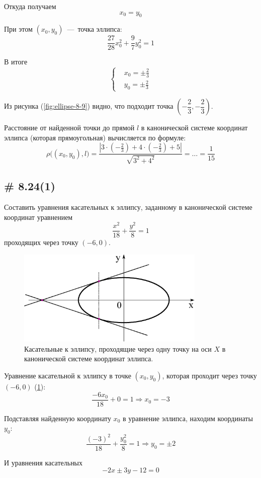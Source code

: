 \documentclass[a4paper,12pt]{article}
\begin{document}
\begin{solution}
    Откуда получаем
    \[
      x_0 = y_0
    \]
    
    При этом $(x_0, y_0)$~---~точка эллипса:
    \[
      \frac{27}{28} x_0^2 + \frac{9}{7} y_0^2 = 1
    \]
    
    В итоге
    \[
      \left\{
        \begin{aligned}
          &x_0 = \pm \frac{2}{3}\\
          &y_0 = \pm \frac{2}{3}
        \end{aligned}
      \right.
    \]
    
    Из рисунка (\ref{fig:ellipse-8-9}) видно, что подходит точка $\left(-\dfrac{2}{3}, -\dfrac{2}{3}\right)$.
    
    Расстояние от найденной точки до прямой $l$ в канонической системе координат эллипса (которая прямоугольная) вычисляется по формуле:
    \[
      \rho{\bigl((x_0, y_0), l\bigr)} = \frac{\left|3 \cdot \left(-\frac{2}{3}\right) + 4 \cdot \left(-\frac{2}{3}\right) + 5\right|}{\sqrt{3^2 + 4^2}} = \ldots = \frac{1}{15}
    \]
  \end{solution}
  
  
  
  \subsection{\# 8.24(1)}
  
  Составить уравнения касательных к эллипсу, заданному в канонической системе координат уравнением
  \[
    \frac{x^2}{18} + \frac{y^2}{8} = 1
  \]
  проходящих через точку $(-6, 0)$.
  
  \begin{solution}
    \begin{figure}[h]
      \centering

      \includegraphics[width=0.8\textwidth]{ellipse-8-24}
    
      \caption{Касательные к эллипсу, проходящие через одну точку на оси $X$ в канонической системе координат эллипса.}
      \label{fig:ellipse-8-24}
    \end{figure}
    
    Уравнение касательной к эллипсу в точке $(x_0, y_0)$, которая проходит через точку $(-6, 0)$ (\ref{fig:ellipse-8-24}):
    \[
      \frac{-6 x_0}{18} + 0 = 1 \Rightarrow x_0 = -3
    \]
    
    Подставляя найденную координату $x_0$ в уравнение эллипса, находим координаты $y_0$:
    \[
      \frac{(-3)^2}{18} + \frac{y_0^2}{8} = 1 \Rightarrow y_0 = \pm 2
    \]
    
    И уравнения касательных
    \[
      -2x \pm 3y - 12 = 0
    \]
  \end{solution}
  
\end{document}
